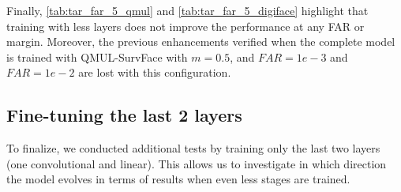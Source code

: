 \documentclass[class=report, crop=false, a4paper, 12pt]{standalone}
\begin{document}
\par Finally, \autoref{tab:tar_far_5_qmul} and \autoref{tab:tar_far_5_digiface} highlight that training with less layers does not improve the performance at any FAR or margin. Moreover, the previous enhancements verified when the complete model is trained with QMUL-SurvFace with $m=0.5$, and $FAR=1e-3$ and $FAR=1e-2$ are lost with this configuration.


\subsection*{Fine-tuning the last 2 layers}

To finalize, we conducted additional tests by training only the last two layers (one convolutional and linear). This allows us to investigate in which direction the model evolves in terms of results when even less stages are trained.
\end{document}
